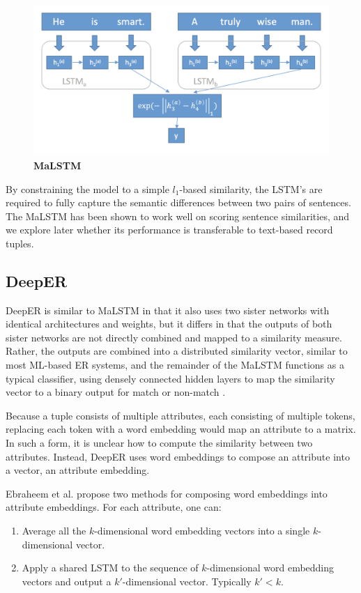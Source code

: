 \documentclass{proc}
\begin{document}
\begin{figure}
\includegraphics[scale=0.4]{../imgs/malstm-architecture.png}
	\caption{\textbf{MaLSTM}}
	\label{fig:malstm}
\end{figure}

By constraining the model to a simple $l_1$-based similarity, the LSTM's are required to fully capture the semantic differences between two pairs of sentences. The MaLSTM has been shown to work well on scoring sentence similarities, and we explore later whether its performance is transferable to text-based record tuples.

\subsection{DeepER}

DeepER is similar to MaLSTM in that it also uses two sister networks with identical architectures and weights, but it differs in that the outputs of both sister networks are not directly combined and mapped to a similarity measure. Rather, the outputs are combined into a distributed similarity vector, similar to most ML-based ER systems, and the remainder of the MaLSTM functions as a typical classifier, using densely connected hidden layers to map the similarity vector to a binary output for match or non-match \cite{ebraheem-deep-er}.

Because a tuple consists of multiple attributes, each consisting of multiple tokens, replacing each token with a word embedding would map an attribute to a matrix. In such a form, it is unclear how to compute the similarity between two attributes. Instead, DeepER uses word embeddings to compose an attribute into a vector, an attribute embedding.

Ebraheem et al. propose two methods for composing word embeddings into attribute embeddings. For each attribute, one can:
\begin{enumerate}
\item{Average all the $k$-dimensional word embedding vectors into a single $k$-dimensional vector.}
\item{Apply a shared LSTM to the sequence of $k$-dimensional word embedding vectors and output a $k'$-dimensional vector. Typically $k' < k$.}
\end{enumerate}
\end{document}
